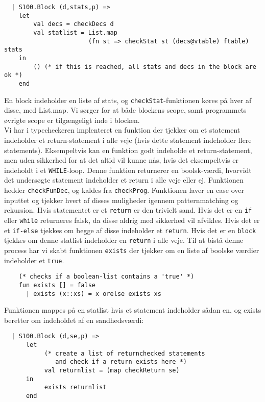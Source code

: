 \documentclass[12pt]{article}
\begin{document}
\begin{verbatim}
  | S100.Block (d,stats,p) =>
    let
        val decs = checkDecs d
        val statlist = List.map
                       (fn st => checkStat st (decs@vtable) ftable) stats
    in
        () (* if this is reached, all stats and decs in the block are ok *)
    end
\end{verbatim}

En block indeholder en liste af stats, og \texttt{checkStat}-funktionen køres på
hver af disse, med List.map. Vi sørger for at både blockens scope, samt
programmets øvrigte scope er tilgængeligt inde i blocken.\\

Vi har i typecheckeren implenteret en funktion der tjekker om et statement
indeholder et return-statement i alle veje (hvis dette statement indeholder
flere statements). Eksempeltvis kan en funktion godt indeholde et
return-statement, men uden sikkerhed for at det altid vil kunne nås, hvis det
eksempeltvis er indeholdt i et \texttt{WHILE}-loop. Denne funktion returnerer en
boolsk-værdi, hvorvidt det undersøgte statement  indeholder et return i alle
veje eller ej. Funktionen hedder \texttt{checkFunDec}, og kaldes fra
\texttt{checkProg}. Funktionen laver en case over inputtet og tjekker hvert af
disses muligheder igennem patternmatching og rekursion. Hvis statementet er et
\texttt{return} er den trivielt sand. Hvis det er en \texttt{if} eller
\texttt{while} returneres falsk, da disse aldrig med sikkerhed vil afvikles.
Hvis det er et \texttt{if-else} tjekkes om begge af disse indeholder et
\texttt{return}. Hvis det er en \texttt{block} tjekkes om denne statlist
indeholder en \texttt{return} i alle veje. Til at bistå denne process har vi
skabt funktionen \texttt{exists} der tjekker om en liste af boolske værdier
indeholder et \texttt{true}.

\begin{verbatim}
    (* checks if a boolean-list contains a 'true' *)
    fun exists [] = false
      | exists (x::xs) = x orelse exists xs
\end{verbatim}

Funktionen mappes på en statlist hvis et statement indeholder sådan en, og
exists beretter om indeholdet af en sandhedsværdi:\\

\begin{verbatim}
  | S100.Block (d,se,p) =>
      let
           (* create a list of returnchecked statements
              and check if a return exists here *)
           val returnlist = (map checkReturn se)
      in
           exists returnlist
      end
\end{verbatim}
\end{document}
